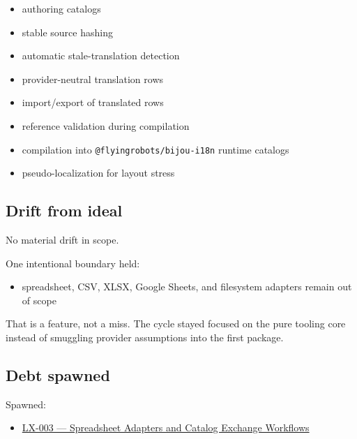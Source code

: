 \begin{itemize}
  \begin{itemize}
  \tightlist
  \item
    authoring catalogs
  \item
    stable source hashing
  \item
    automatic stale-translation detection
  \item
    provider-neutral translation rows
  \item
    import/export of translated rows
  \item
    reference validation during compilation
  \item
    compilation into \texttt{@\allowbreak{}f\allowbreak{}l\allowbreak{}y\allowbreak{}i\allowbreak{}n\allowbreak{}g\allowbreak{}r\allowbreak{}o\allowbreak{}b\allowbreak{}o\allowbreak{}t\allowbreak{}s\allowbreak{}/\allowbreak{}b\allowbreak{}i\allowbreak{}j\allowbreak{}o\allowbreak{}u\allowbreak{}-\allowbreak{}i\allowbreak{}1\allowbreak{}8\allowbreak{}n} runtime catalogs
  \item
    pseudo-localization for layout stress
  \end{itemize}
\end{itemize}

\subsection{Drift from ideal}\label{record-189-drift-from-ideal}

No material drift in scope.

One intentional boundary held:

\begin{itemize}
\tightlist
\item
  spreadsheet, CSV, XLSX, Google Sheets, and filesystem adapters remain out of scope
\end{itemize}

That is a feature, not a miss. The cycle stayed focused on the pure tooling core instead of smuggling provider assumptions into the first package.

\subsection{Debt spawned}\label{record-189-debt-spawned}

Spawned:

\begin{itemize}
\tightlist
\item
  \href{https://github.com/flyingrobots/bijou/blob/cbd70612140e7a450d764b3c7be1c6af878b99bc/docs/method/graveyard/legacy-backlog/LX-003-spreadsheet-adapters-and-catalog-exchange-workflows.md}{LX-003 --- Spreadsheet Adapters and Catalog Exchange Workflows}
\end{itemize}

